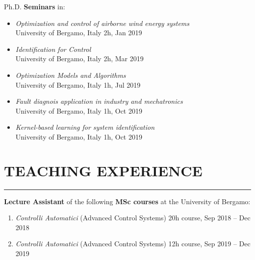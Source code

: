\documentclass[10pt]{article}
\newcommand{\cvsection}[1]{\section*{\centering\normalsize\uppercase{#1}}\vspace{-16pt}\rule{\linewidth}{0.2pt}\vspace{6pt}}
\begin{document}
Ph.D. \textbf{Seminars} in:
\begin{itemize}
	\setlength\itemsep{-3pt}
	\renewcommand\labelitemi{$\vcenter{\hbox{\tiny$\bullet$}}$}
	\item \textit{Optimization and control of airborne wind energy systems}\\
	University of Bergamo, Italy \hfill 2h, Jan 2019\\
	\item \textit{Identification for Control}\\
	University of Bergamo, Italy \hfill 2h, Mar 2019\\
	\item \textit{Optimization Models and Algorithms}\\
	University of Bergamo, Italy \hfill 1h, Jul 2019\\
	\item \textit{Fault diagnois application in industry and mechatronics}\\
	University of Bergamo, Italy \hfill 1h, Oct 2019\\
	\item \textit{Kernel-based learning for system identification}\\
	University of Bergamo, Italy \hfill 1h, Oct 2019\\
\end{itemize}


\cvsection{teaching experience}

\textbf{Lecture Assistant} of the following \textbf{MSc courses} at the University of Bergamo:
\begin{enumerate}
	\setlength\itemsep{-3pt}
	\item \textit{Controlli Automatici} (Advanced Control Systems) \hfill 20h course, Sep 2018 – Dec 2018\\
	\item \textit{Controlli Automatici} (Advanced Control Systems) \hfill 12h course, Sep 2019 – Dec 2019\\
\end{enumerate}

\vspace{6pt} %
\end{document}
